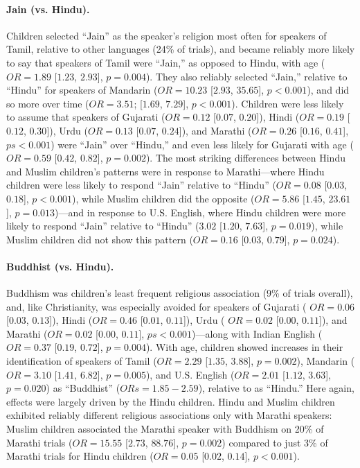 \documentclass{foushee-adapted-preprint}
\begin{document}
\paragraph{Jain (vs. Hindu).}
Children selected ``Jain'' as the speaker's religion most often for speakers of Tamil, relative to other languages (24\% of trials), and became reliably more likely to say that speakers of Tamil were ``Jain,'' as opposed to Hindu, with age ($OR=1.89$ [$1.23$, $2.93$], $p=0.004$). 
They also reliably selected ``Jain,'' relative to ``Hindu'' for speakers of Mandarin ($OR=10.23$ [$2.93$, $35.65$], $p<0.001$), and did so more over time ($OR=3.51$; [$1.69$, $7.29$], $p<0.001$). 
Children were less likely to assume that speakers of Gujarati ($OR=0.12$ [$0.07$, $0.20$]), Hindi ($OR=0.19$ [$0.12$, $0.30$]), Urdu ($OR=0.13$ [$0.07$, $0.24$]), and Marathi ($OR=0.26$ [$0.16$, $0.41$], $ps<0.001$) were ``Jain'' over ``Hindu,'' and even less likely for Gujarati with age ($OR=0.59$ [$0.42$, $0.82$], $p=0.002$). 
The most striking differences between Hindu and Muslim children's patterns were in response to Marathi---where Hindu children were less likely to respond ``Jain'' relative to ``Hindu'' ($OR=0.08$ [$0.03$, $0.18$], $p<0.001$), while Muslim children did the opposite ($OR=5.86$ [$1.45$, $23.61$], $p=0.013$)---and in response to U.S. English, where Hindu children were more likely to respond ``Jain'' relative to ``Hindu'' ($3.02$ [$1.20$, $7.63$], $p=0.019$), while Muslim children did not show this pattern ($OR=0.16$ [$0.03$, $0.79$], $p=0.024$).

\paragraph{Buddhist (vs. Hindu).}
Buddhism was children's least frequent religious association (9\% of trials overall), and, like Christianity, was especially avoided for speakers of Gujarati (%
$OR=0.06$ [$0.03$, $0.13$]), Hindi ($OR=0.46$ [$0.01$, $0.11$]), %
Urdu (%
$OR=0.02$ [$0.00$, $0.11$]), and Marathi %
($OR=0.02$ [$0.00$, $0.11$], $ps<0.001$)---along with Indian English ($OR=0.37$ [$0.19$, $0.72$], $p=0.004$). %
With age, children showed increases in their identification of speakers of Tamil ($OR=2.29$ [$1.35$, $3.88$], $p=0.002$), Mandarin ($OR=3.10$ [$1.41$, $6.82$], $p=0.005$), and U.S. English ($OR=2.01$ [$1.12$, $3.63$], $p=0.020$) as ``Buddhist'' ($ORs=1.85-2.59$), relative to as ``Hindu.'' 
Here again, effects were largely driven by the Hindu children. 
Hindu and Muslim children exhibited reliably different religious associations only with Marathi speakers: Muslim children associated the Marathi speaker with Buddhism on 20\% of Marathi trials ($OR=15.55$ [$2.73$, $88.76$], $p=0.002$) compared to just 3\% of Marathi trials for Hindu children ($OR=0.05$ [$0.02$, $0.14$], $p<0.001$). 
\end{document}
